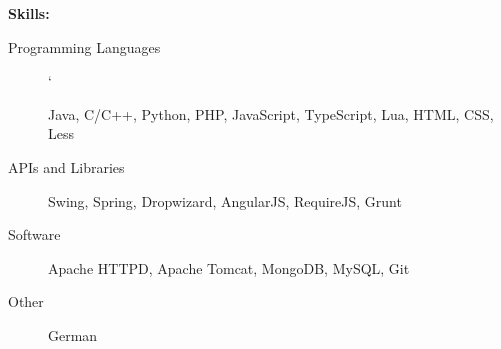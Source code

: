 \documentclass[11pt]{article}
\begin{document}
\smallskip
\hrulefill
\bigskip
{\Large \bf Skills:}
\begin{description}
\item[Programming Languages]
\hfill`

Java, C/C++, Python, PHP, JavaScript, TypeScript, Lua, HTML, CSS, Less

\item[APIs and Libraries]
\hfill

Swing, Spring, Dropwizard, AngularJS, RequireJS, Grunt

\item[Software]
\hfill

Apache HTTPD, Apache Tomcat, MongoDB, MySQL, Git

\item[Other]
\hfill

German
\end{description}
\end{document}
